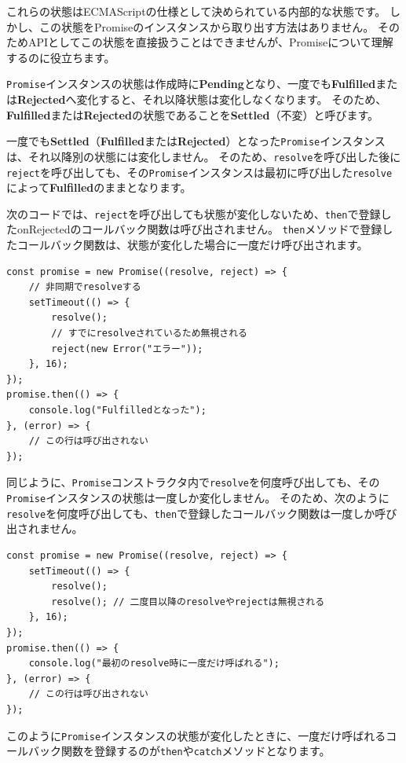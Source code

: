 これらの状態はECMAScriptの仕様として決められている内部的な状態です。
しかし、この状態をPromiseのインスタンスから取り出す方法はありません。
そのためAPIとしてこの状態を直接扱うことはできませんが、Promiseについて理解するのに役立ちます。

\texttt{Promise}インスタンスの状態は作成時に\textbf{Pending}となり、一度でも\textbf{Fulfilled}または\textbf{Rejected}へ変化すると、それ以降状態は変化しなくなります。
そのため、\textbf{Fulfilled}または\textbf{Rejected}の状態であることを\textbf{Settled}（不変）と呼びます。

一度でも\textbf{Settled}（\textbf{Fulfilled}または\textbf{Rejected}）となった\texttt{Promise}インスタンスは、それ以降別の状態には変化しません。
そのため、\texttt{resolve}を呼び出した後に\texttt{reject}を呼び出しても、その\texttt{Promise}インスタンスは最初に呼び出した\texttt{resolve}によって\textbf{Fulfilled}のままとなります。

次のコードでは、\texttt{reject}を呼び出しても状態が変化しないため、\texttt{then}で登録したonRejectedのコールバック関数は呼び出されません。
\texttt{then}メソッドで登録したコールバック関数は、状態が変化した場合に一度だけ呼び出されます。

\enlargethispage{\baselineskip}\begin{lstlisting}
const promise = new Promise((resolve, reject) => {
    // 非同期でresolveする
    setTimeout(() => {
        resolve();
        // すでにresolveされているため無視される
        reject(new Error("エラー"));
    }, 16);
});
promise.then(() => {
    console.log("Fulfilledとなった");
}, (error) => {
    // この行は呼び出されない
});
\end{lstlisting}

同じように、\texttt{Promise}コンストラクタ内で\texttt{resolve}を何度呼び出しても、その\texttt{Promise}インスタンスの状態は一度しか変化しません。
そのため、次のように\texttt{resolve}を何度呼び出しても、\texttt{then}で登録したコールバック関数は一度しか呼び出されません。

\begin{lstlisting}
const promise = new Promise((resolve, reject) => {
    setTimeout(() => {
        resolve();
        resolve(); // 二度目以降のresolveやrejectは無視される
    }, 16);
});
promise.then(() => {
    console.log("最初のresolve時に一度だけ呼ばれる");
}, (error) => {
    // この行は呼び出されない
});
\end{lstlisting}

このように\texttt{Promise}インスタンスの状態が変化したときに、一度だけ呼ばれるコールバック関数を登録するのが\texttt{then}や\texttt{catch}メソッドとなります。

